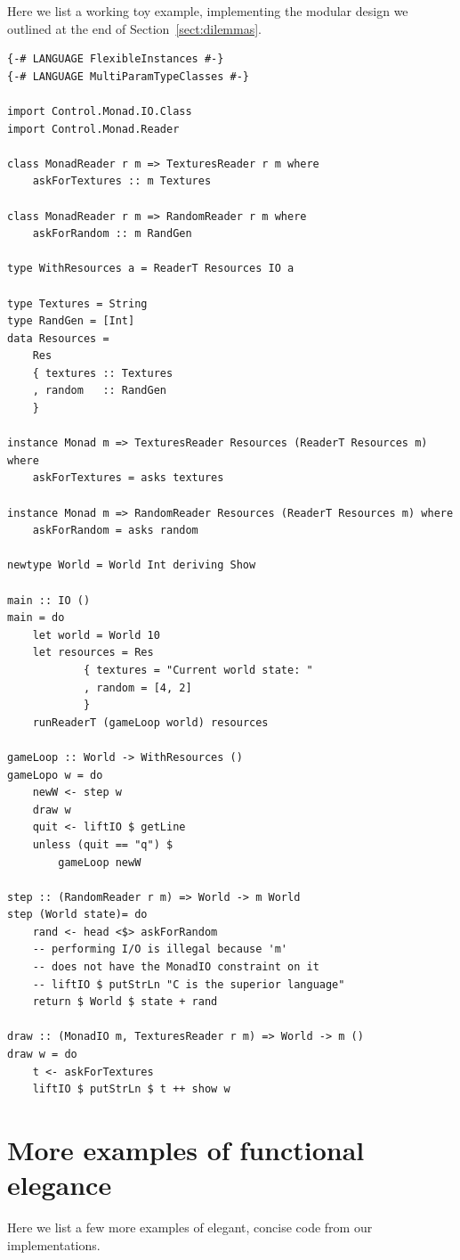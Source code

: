\documentclass[
  digital, %
  color,   %
  table,   %
  oneside, %
  lof,     %
  lot,     %
]{fithesis3}
\begin{document}
{Here we list a working toy example, implementing the modular design
we outlined at the end of Section~\ref{sect:dilemmas}.

\begin{verbatim}
{-# LANGUAGE FlexibleInstances #-}
{-# LANGUAGE MultiParamTypeClasses #-}

import Control.Monad.IO.Class
import Control.Monad.Reader

class MonadReader r m => TexturesReader r m where
    askForTextures :: m Textures

class MonadReader r m => RandomReader r m where
    askForRandom :: m RandGen

type WithResources a = ReaderT Resources IO a

type Textures = String
type RandGen = [Int]
data Resources =
    Res
    { textures :: Textures
    , random   :: RandGen
    }

instance Monad m => TexturesReader Resources (ReaderT Resources m) where
    askForTextures = asks textures

instance Monad m => RandomReader Resources (ReaderT Resources m) where
    askForRandom = asks random

newtype World = World Int deriving Show

main :: IO ()
main = do
    let world = World 10
    let resources = Res  
            { textures = "Current world state: "
            , random = [4, 2]
            }
    runReaderT (gameLoop world) resources  

gameLoop :: World -> WithResources ()
gameLopo w = do
    newW <- step w
    draw w
    quit <- liftIO $ getLine
    unless (quit == "q") $
        gameLoop newW

step :: (RandomReader r m) => World -> m World
step (World state)= do
    rand <- head <$> askForRandom
    -- performing I/O is illegal because 'm'
    -- does not have the MonadIO constraint on it
    -- liftIO $ putStrLn "C is the superior language"
    return $ World $ state + rand

draw :: (MonadIO m, TexturesReader r m) => World -> m ()
draw w = do
    t <- askForTextures
    liftIO $ putStrLn $ t ++ show w

\end{verbatim}


\pagebreak
\section{More examples of functional elegance}
\label{app:elegance}
Here we list a few more examples of elegant, concise code from our implementations.

}
\end{document}
